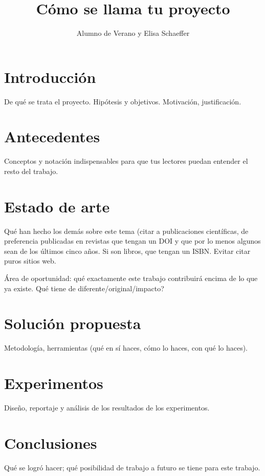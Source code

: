 \documentclass[a3]{sciposter}
\title{Cómo se llama tu proyecto}
\author{Alumno de Verano y Elisa Schaeffer}
\institute {Posgrado en Ingeniería de Sistemas}
\begin{document}

\maketitle

\section{Introducción}

De qué se trata el proyecto. Hipótesis y objetivos. Motivación,
justificación.

\section{Antecedentes}

Conceptos y notación indispensables para que tus lectores puedan
entender el resto del trabajo.

\section{Estado de arte}

Qué han hecho los demás sobre este tema (citar a publicaciones
científicas, de preferencia publicadas en revistas que tengan un DOI y
que por lo menos algunos sean de los últimos cinco años. Si son
libros, que tengan un ISBN. Evitar citar puros sitios web.

Área de oportunidad: qué exactamente este trabajo contribuirá encima
de lo que ya existe. {\textquestiondown}Qué tiene de
diferente/original/impacto?

\section{Solución propuesta}

Metodología, herramientas (qué en sí haces, cómo lo haces, con qué lo
haces).

\section{Experimentos}

Diseño, reportaje y análisis de los resultados de los experimentos.

\section{Conclusiones}

Qué se logró hacer; qué posibilidad de trabajo a futuro se tiene para
este trabajo.
\end{document}
